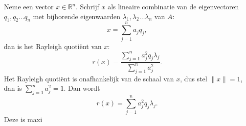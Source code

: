 Neme een vector $x \in \mathbb{R}^n$. Schrijf $x$ als lineaire combinatie van de eigenvectoren $q_1, q_2 \dots q_n$ met bijhorende eigenwaarden $\lambda_1, \lambda_2 \dots \lambda_n$ van $A$:
$$ x = \sum_{j=1}^{n}a_jq_j,$$
dan is het Rayleigh quoti\"ent van $x$:
$$r(x) = \frac{\sum_{j=1}^{n}a_j^2q_j\lambda_j}{\sum_{j=1}^{n}a_j^2}.$$
Het Rayleigh quoti\"ent is onafhankelijk van de schaal van $x$, dus stel $\lVert x \rVert = 1$, dan is $\sum_{j=1}^{n}a_j^2 = 1$. Dan wordt
$$r(x) = \sum_{j=1}^{n}a_j^2q_j\lambda_j.$$
Deze is maxi

